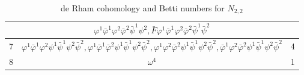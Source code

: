\documentclass[a4paper, 11pt]{amsart}
\theoremstyle{plain}
\theoremstyle{definition}
\numberwithin{equation}{section}
\begin{document}
\begin{table}[H]
\begin{tabular}{|c|c|c|}
    & $\varphi^{1}\bar\varphi^{1}\varphi^{2}\bar\varphi^{2}\bar\psi^{1}\psi^{2}, \bar F \varphi^{1}\bar\varphi^{1}\varphi^{2}\bar\varphi^{2}\bar\psi^{1}\bar\psi^{2} $ & \\
	\hline
    7 &$ \varphi^{1}\bar\varphi^{1}\varphi^{2}\psi^{1}\bar\psi^{1}\psi^{2}\bar\psi^{2}, \varphi^{1}\bar\varphi^{1}\bar\varphi^{2}\psi^{1}\bar\psi^{1}\psi^{2}\bar\psi^{2}, \varphi^{1}\varphi^{2}\bar\varphi^{2}   \psi^{1}\bar\psi^{1}\psi^{2}\bar\psi^{2}, \bar\varphi^{1}\varphi^{2}\bar\varphi^{2}\psi^{1}\bar\psi^{1}\psi^{2}\bar\psi^{2}$& 4\\
    \hline
    8 & $\omega^{4}$ & 1\\
    \hline
	\end{tabular}
    \caption{de Rham cohomology and Betti numbers for $ N_{2,2} $}
    \label{table:3}
    \end{table}
\end{document}
